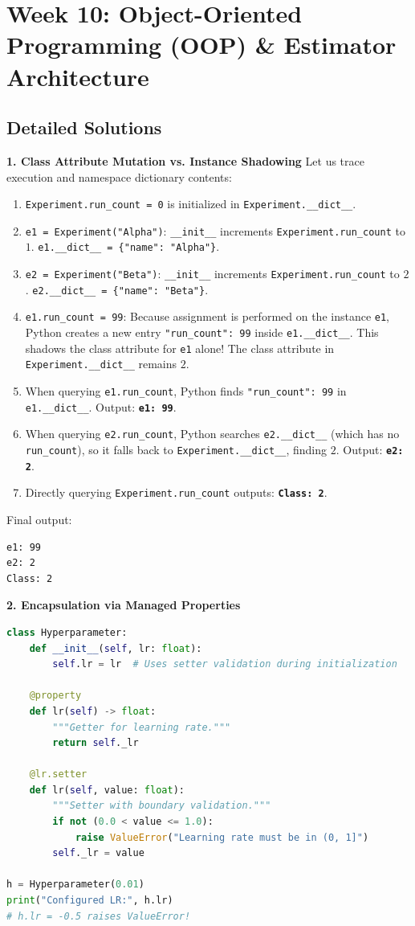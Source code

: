 \section*{Week 10: Object-Oriented Programming (OOP) \& Estimator Architecture}

\subsection*{Detailed Solutions}

\textbf{1. Class Attribute Mutation vs. Instance Shadowing}
Let us trace execution and namespace dictionary contents:
\begin{enumerate}
    \item \texttt{Experiment.run\_count = 0} is initialized in \texttt{Experiment.\_\_dict\_\_}.
    \item \texttt{e1 = Experiment("Alpha")}: \texttt{\_\_init\_\_} increments \texttt{Experiment.run\_count} to $1$. \texttt{e1.\_\_dict\_\_ = \{"name": "Alpha"\}}.
    \item \texttt{e2 = Experiment("Beta")}: \texttt{\_\_init\_\_} increments \texttt{Experiment.run\_count} to $2$. \texttt{e2.\_\_dict\_\_ = \{"name": "Beta"\}}.
    \item \texttt{e1.run\_count = 99}: Because assignment is performed on the instance \texttt{e1}, Python creates a new entry \texttt{"run\_count": 99} inside \texttt{e1.\_\_dict\_\_}. This shadows the class attribute for \texttt{e1} alone! The class attribute in \texttt{Experiment.\_\_dict\_\_} remains $2$.
    \item When querying \texttt{e1.run\_count}, Python finds \texttt{"run\_count": 99} in \texttt{e1.\_\_dict\_\_}. Output: \textbf{\texttt{e1: 99}}.
    \item When querying \texttt{e2.run\_count}, Python searches \texttt{e2.\_\_dict\_\_} (which has no \texttt{run\_count}), so it falls back to \texttt{Experiment.\_\_dict\_\_}, finding $2$. Output: \textbf{\texttt{e2: 2}}.
    \item Directly querying \texttt{Experiment.run\_count} outputs: \textbf{\texttt{Class: 2}}.
\end{enumerate}
Final output:
\begin{lstlisting}
e1: 99
e2: 2
Class: 2
\end{lstlisting}

\textbf{2. Encapsulation via Managed Properties}
\begin{lstlisting}[language=Python]
class Hyperparameter:
    def __init__(self, lr: float):
        self.lr = lr  # Uses setter validation during initialization

    @property
    def lr(self) -> float:
        """Getter for learning rate."""
        return self._lr

    @lr.setter
    def lr(self, value: float):
        """Setter with boundary validation."""
        if not (0.0 < value <= 1.0):
            raise ValueError("Learning rate must be in (0, 1]")
        self._lr = value

h = Hyperparameter(0.01)
print("Configured LR:", h.lr)
# h.lr = -0.5 raises ValueError!
\end{lstlisting}

